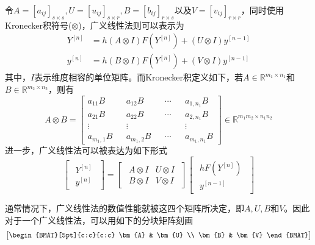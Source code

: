 令$A=[a_{ij}]_{s\times s},U=[u_{ij}]_{s\times r},B=[b_{ij}]_{r\times s}$以及$V=[v_{ij}]_{r\times r}$，同时使用Kronecker积符号($\otimes$)，广义线性法则可以表示为
\begin{align}
Y^{[n]}&=h(A\otimes I)F(Y^{[n]})+(U\otimes I)y^{[n-1]}\\
y^{[n]}&=h(B\otimes I)F(Y^{[n]})+(V\otimes I)y^{[n-1]}
\end{align}
其中，$I$表示维度相容的单位矩阵。而Kronecker积定义如下，若$A\in\mathbb{R}^{m_1\times n_1}$和$B\in\mathbb{R}^{m_2\times n_2}$，则有
\begin{equation}
A\otimes B=\begin{bmatrix}
a_{11} B&&a_{12}B&&\cdots && a_{1,n_1} B\\
a_{21}B&&a_{22}B&&\cdots && a_{2,n_1}B\\
\vdots &&\vdots && &&\vdots\\
a_{m_1,1}B &&a_{m_1,2}B&&\cdots &&a_{m_1,n_1}B
\end{bmatrix}\in\mathbb{R}^{m_1m_2\times n_1n_2}
\end{equation}
进一步，广义线性法可以被表达为如下形式
\begin{equation}
\begin{bmatrix}
\begin{array}{c}
Y^{[n]}\\ \hline
y^{[n]}
\end{array}
\end{bmatrix}=\begin{bmatrix}
\begin{array}{c|c}
A\otimes I & U\otimes I \\ \hline
B\otimes I & V\otimes I
\end{array}
\end{bmatrix}\begin{bmatrix}
\begin{array}{c}
hF(Y^{[n]})\\ \hline
y^{[n-1]}
\end{array}
\end{bmatrix}\label{eq:ch2GLM}
\end{equation}

通常情况下，广义线性法的数值性能就被这四个矩阵所决定，即$A,U,B$和$V$。因此对于一个广义线性法，可以用如下的分块矩阵刻画
\begin{equation}
\begin{bmatrix}
\begin{BMAT}[5pt]{c:c}{c:c}
	\bm{A} & \bm{U} \\
	\bm{B} & \bm{V}
\end{BMAT}
\end{bmatrix}
\end{equation}

